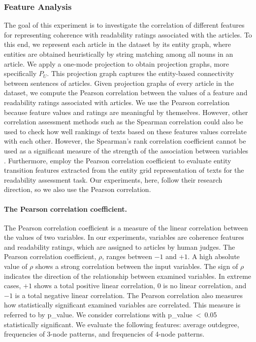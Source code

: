 \subsubsection{Feature Analysis}
The goal of this experiment is to investigate the correlation of different features for representing coherence with readability ratings associated with the articles. 
To this end, we represent each article in the dataset by its entity graph, where entities are obtained heuristically by string matching among all nouns in an article. 
We apply a one-mode projection to obtain projection graphs, more specifically $P_U$. 
This projection graph captures the entity-based connectivity between sentences of articles. 
Given projection graphs of every article in the dataset, we compute the Pearson correlation between the values of a feature and readability ratings associated with articles. 
We use the Pearson correlation because feature values and ratings are meaningful by themselves. 
However, other correlation assessment methods such as the Spearman correlation could also be used to check how well rankings of texts based on these features values correlate with each other. 
However, the Spearman's rank correlation coefficient cannot be used as a significant measure of the strength of the association between variables \cite{hauke11}.
Furthermore,  employ the Pearson correlation coefficient to evaluate entity transition features extracted from the entity grid representation \cite{barzilay08} of texts for the readability assessment task. 
Our experiments, here, follow their research direction, so we also use the Pearson correlation. 

\paragraph{The Pearson correlation coefficient.} 
The Pearson correlation coefficient is a measure of the linear correlation between the values of two variables. 
In our experiments, variables are coherence features and readability ratings, which are assigned to articles by human judges.  
The Pearson correlation coefficient, $\rho$, ranges between $-1$ and $+1$. 
A high absolute value of $\rho$ shows a strong correlation between the input variables. 
The sign of $\rho$ indicates the direction of the relationship between examined variables. 
In extreme cases, $+1$ shows a total positive linear correlation, $0$ is no linear correlation, and $-1$ is a total negative linear correlation. 
The Pearson correlation also measures how statistically significant examined variables are correlated. 
This measure is referred to by p\_value. 
We consider correlations with \mbox{p\_value < 0.05} statistically significant. 
We evaluate the following features: average outdegree, frequencies of 3-node patterns, and frequencies of 4-node patterns. 

